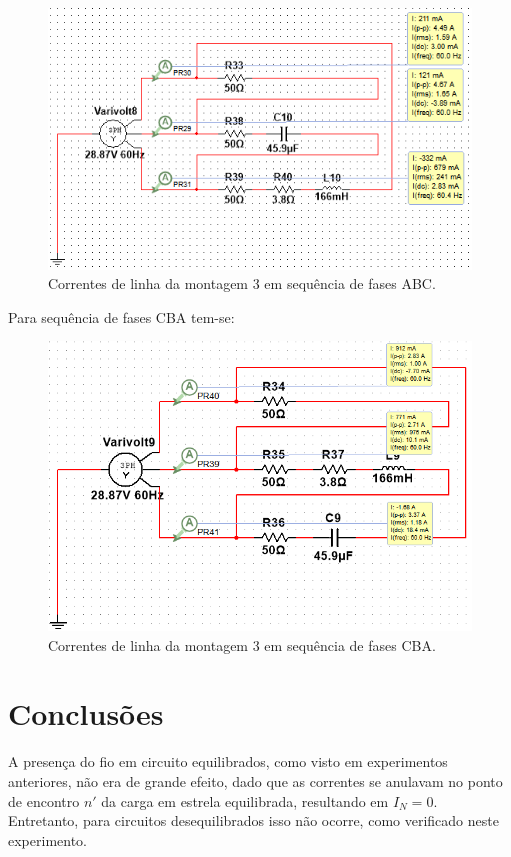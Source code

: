 \documentclass[a4paper,12pt,oneside,openany,table,xcdraw]{article}
\begin{document}
\begin{figure}[H]
\centering
\includegraphics[width=13.5cm]{m3-esquema-abc-correntes}
\caption{Correntes de linha da montagem 3 em sequência de fases ABC.}
\label{m2:IL}
\end{figure}

\vspace{0.3cm}
Para sequência de fases CBA tem-se: 

\begin{figure}[H]
\centering
\includegraphics[width=13.5cm]{m3-esquema-cba-correntes}
\caption{Correntes de linha da montagem 3 em sequência de fases CBA.}
\label{m2:IL}
\end{figure}


\newpage
\section{Conclusões} %
A presença do fio em circuito equilibrados, como visto em experimentos anteriores, não era de grande efeito, dado que as correntes se anulavam no ponto de encontro $n'$ da carga em estrela equilibrada, resultando em $I_N=0$. Entretanto, para circuitos desequilibrados isso não ocorre, como verificado neste experimento.
\end{document}
